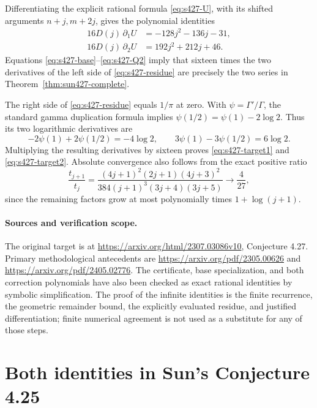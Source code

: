 \documentclass[11pt,a4paper]{article}
\theoremstyle{remark}\newtheorem{remark}[theorem]{Remark}
\numberwithin{equation}{section}
\begin{document}
Differentiating the explicit rational formula \eqref{eq:s427-U}, with
its shifted arguments $n+j,m+2j$, gives the polynomial identities
\begin{align}
 16D(j)\,\partial_1 U&=-128j^2-136j-31,
 \label{eq:s427-Q1}\\
 16D(j)\,\partial_2 U&=192j^2+212j+46.
 \label{eq:s427-Q2}
\end{align}
Equations \eqref{eq:s427-base}--\eqref{eq:s427-Q2} imply that sixteen
times the two derivatives of the left side of
\eqref{eq:s427-residue} are precisely the two series in
Theorem~\ref{thm:sun427-complete}.

The right side of \eqref{eq:s427-residue} equals $1/\pi$ at zero.
With $\psi=\Gamma'/\Gamma$, the standard gamma duplication formula
implies $\psi(1/2)=\psi(1)-2\log2$. Thus its two logarithmic
derivatives are
\[
 -2\psi(1)+2\psi(1/2)=-4\log2,
 \qquad
 3\psi(1)-3\psi(1/2)=6\log2.
\]
Multiplying the resulting derivatives by sixteen proves
\eqref{eq:s427-target1} and \eqref{eq:s427-target2}.
Absolute convergence also follows from the exact positive ratio
\[
 \frac{t_{j+1}}{t_j}
 =\frac{(4j+1)^2(2j+1)(4j+3)^2}
 {384(j+1)^3(3j+4)(3j+5)}\longrightarrow\frac4{27},
\]
since the remaining factors grow at most polynomially times
$1+\log(j+1)$.

\paragraph{Sources and verification scope.}
The original target is at
\url{https://arxiv.org/html/2307.03086v10}, Conjecture 4.27.
Primary methodological antecedents are
\url{https://arxiv.org/pdf/2305.00626} and
\url{https://arxiv.org/pdf/2405.02776}.
The certificate, base specialization, and both correction polynomials
have also been checked as exact rational identities by symbolic
simplification. The proof of the infinite identities is the finite
recurrence, the geometric remainder bound, the explicitly evaluated
residue, and justified differentiation; finite numerical agreement is
not used as a substitute for any of those steps.

\clearpage
\section{Both identities in Sun's Conjecture 4.25}
\label{sec:sun425-complete}
\end{document}
